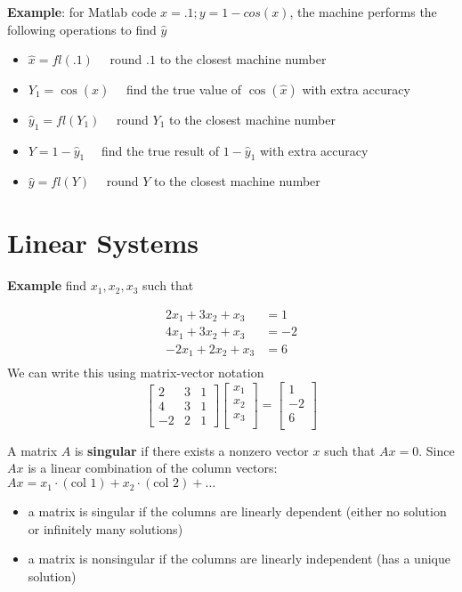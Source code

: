 \documentclass{article}
\begin{document}
\textbf{Example}: for Matlab code $x = .1; y = 1 - cos(x)$, the machine performs the following operations to find $\hat{y}$
\begin{itemize}
  \item $\hat{x} = fl(.1) \quad$ round $.1$ to the closest machine number
  \item $Y_1 = \cos(\hat{x}) \quad$ find the true value of $\cos(\hat{x})$ with extra accuracy
  \item $\hat{y}_1 = fl(Y_1) \quad$ round $Y_1$ to the closest machine number
  \item $Y = 1 - \hat{y}_1 \quad$ find the true result of $1 - \hat{y}_1$ with extra accuracy
  \item $\hat{y} = fl(Y) \quad$ round $Y$ to the closest machine number
\end{itemize}
\section{Linear Systems}
\textbf{Example} find $x_1, x_2, x_3$ such that 

\begin{align*}
  2x_1 + 3x_2 + x_3 &= 1 \\
  4x_1 + 3x_2 + x_3 &= -2\\
  -2x_1 + 2x_2 + x_3 &= 6\\
\end{align*}
We can write this using matrix-vector notation
\[ \left[ \begin{array}{ccc}
    2 & 3 & 1 \\
    4 & 3 & 1 \\
    -2 & 2 & 1
\end{array} \right]
%
\left[ \begin{array}{c}
    x_1 \\
    x_2 \\
    x_3 \\
\end{array} \right]
 =
\left[ \begin{array}{c}
    1 \\
    -2 \\
    6 \\
\end{array} \right]
\]

A matrix $A$ is \textbf{singular} if there exists a nonzero vector $x$ such that $Ax = 0$. Since $Ax$ is a linear combination of the column vectors: $Ax = x_1 \cdot (\text{col } 1) + x_2 \cdot (\text{col } 2) + \ldots$
\begin{itemize}
  \item a matrix is singular if the columns are linearly dependent (either no solution or infinitely many solutions)
  \item a matrix is nonsingular if the columns are linearly independent (has a unique solution)
\end{itemize}
\end{document}
